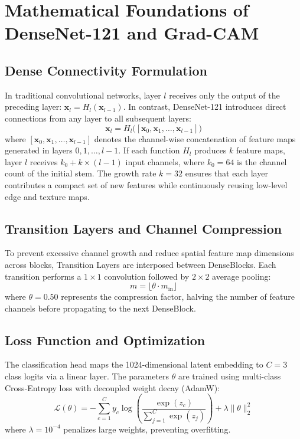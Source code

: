 \documentclass[12pt,a4paper]{report}
\begin{document}
\section{Mathematical Foundations of DenseNet-121 and Grad-CAM}

\subsection{Dense Connectivity Formulation}
In traditional convolutional networks, layer $l$ receives only the output of the preceding layer: $\mathbf{x}_l = H_l(\mathbf{x}_{l-1})$. In contrast, DenseNet-121 introduces direct connections from any layer to all subsequent layers:
\begin{equation}
    \mathbf{x}_l = H_l\big([\mathbf{x}_0, \mathbf{x}_1, \dots, \mathbf{x}_{l-1}]\big)
\end{equation}
where $[\mathbf{x}_0, \mathbf{x}_1, \dots, \mathbf{x}_{l-1}]$ denotes the channel-wise concatenation of feature maps generated in layers $0, 1, \dots, l-1$. If each function $H_l$ produces $k$ feature maps, layer $l$ receives $k_0 + k \times (l - 1)$ input channels, where $k_0 = 64$ is the channel count of the initial stem. The growth rate $k=32$ ensures that each layer contributes a compact set of new features while continuously reusing low-level edge and texture maps.

\subsection{Transition Layers and Channel Compression}
To prevent excessive channel growth and reduce spatial feature map dimensions across blocks, Transition Layers are interposed between DenseBlocks. Each transition performs a $1\times 1$ convolution followed by $2\times 2$ average pooling:
\begin{equation}
    m = \lfloor \theta \cdot m_{\text{in}} \rfloor
\end{equation}
where $\theta = 0.50$ represents the compression factor, halving the number of feature channels before propagating to the next DenseBlock.

\subsection{Loss Function and Optimization}
The classification head maps the 1024-dimensional latent embedding to $C=3$ class logits via a linear layer. The parameters $\theta$ are trained using multi-class Cross-Entropy loss with decoupled weight decay (AdamW):
\begin{equation}
    \mathcal{L}(\theta) = -\sum_{c=1}^C y_c \log \left( \frac{\exp(z_c)}{\sum_{j=1}^C \exp(z_j)} \right) + \lambda \|\theta\|_2^2
\end{equation}
where $\lambda = 10^{-4}$ penalizes large weights, preventing overfitting.
\end{document}
